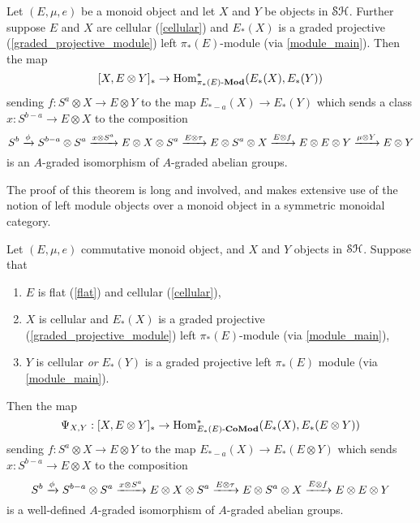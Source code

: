 \documentclass[../main.tex]{subfiles}
\begin{document}
\begin{proposition}\label{UCT_for_graded_projective_main}
    Let $(E,\mu,e)$ be a monoid object and let $X$ and $Y$ be objects in $\mathcal{SH}$. Further suppose $E$ and $X$ are cellular (\autoref{cellular}) and $E_*(X)$ is a graded projective (\autoref{graded_projective_module}) left $\pi_*(E)$-module (via \autoref{module_main}). Then the map
    \[[X,E\otimes Y]_*\to\mathrm{Hom}_{\pi_*(E)\text-\mathbf{Mod}}^*(E_*(X),E_*(Y))\]
    sending $f:S^a\otimes X\to E\otimes Y$ to the map $E_{*-a}(X)\to E_*(Y)$ which sends a class $x:S^{b-a}\to E\otimes X$ to the composition
    \[S^b\xrightarrow\phi S^{b-a}\otimes S^a\xrightarrow{x\otimes S^a}E\otimes X\otimes S^a\xrightarrow{E\otimes\tau}E\otimes S^a\otimes X\xrightarrow{E\otimes f}E\otimes E\otimes Y\xrightarrow{\mu\otimes Y}E\otimes Y\]
    is an $A$-graded isomorphism of $A$-graded abelian groups.
\end{proposition}

The proof of this theorem is long and involved, and makes extensive use of the notion of left module objects over a monoid object in a symmetric monoidal category.

\begin{proposition}\label{[X,EY]-->Hom_E*E(E_*X,E_*EY)_is_iso_for_nice_E,X,Y_main]}
    Let $(E,\mu,e)$ commutative monoid object, and $X$ and $Y$ objects in $\mathcal{SH}$. Suppose that\begin{enumerate}
        \item $E$ is flat (\autoref{flat}) and cellular (\autoref{cellular}),
        \item $X$ is cellular and $E_*(X)$ is a graded projective (\autoref{graded_projective_module}) left $\pi_*(E)$-module (via \autoref{module_main}),
        \item $Y$ is cellular \emph{or} $E_*(Y)$ is a graded projective left $\pi_*(E)$ module (via \autoref{module_main}).
    \end{enumerate}
    Then the map 
    \[\Psi_{X,Y}:[X,E\otimes Y]_*\to\mathrm{Hom}_{E_*(E)\text-\mathbf{CoMod}}^*(E_*(X),E_*(E\otimes Y))\]
    sending $f:S^a\otimes X\to E\otimes Y$ to the map $E_{*-a}(X)\to E_*(E\otimes Y)$ which sends $x:S^{b-a}\to E\otimes X$ to the composition
    \[S^b\xrightarrow\phi S^{b-a}\otimes S^a\xrightarrow{x\otimes S^a}E\otimes X\otimes S^a\xrightarrow{E\otimes\tau}E\otimes S^a\otimes X\xrightarrow{E\otimes f}E\otimes E\otimes Y\]
    is a well-defined $A$-graded isomorphism of $A$-graded abelian groups.
\end{proposition}
\end{document}
